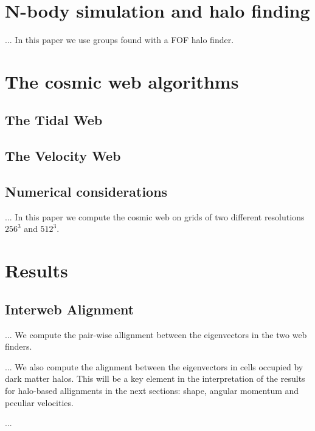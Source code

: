 \documentclass[usenatbib]{mn2e}
\begin{document}
\section{N-body simulation and halo finding}


... In this paper we use groups found with a FOF halo finder.

\section{The cosmic web algorithms}
\label{sec:algorithms}

\subsection{The Tidal Web}



\subsection{The Velocity Web}

\subsection{Numerical considerations}

... In this paper we compute the cosmic web on grids of two different
resolutions $256^3$ and $512^3$.

\section{Results}

\subsection{Interweb Alignment}
... We compute the pair-wise allignment between the eigenvectors in
the two web finders. 

... We also compute the alignment between the eigenvectors in cells
occupied by dark matter halos. This will be a key element in the
interpretation of the results for halo-based allignments in the next
sections: shape, angular momentum and peculiar velocities.

... 
\end{document}
